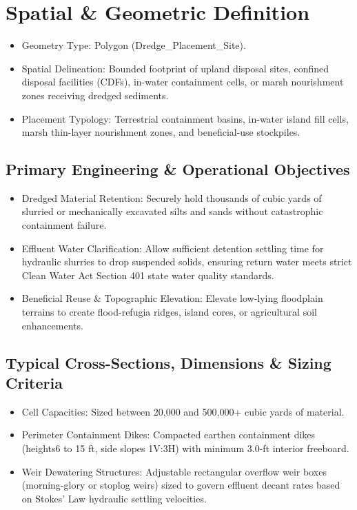 \documentclass[
  letterpaper,
  DIV=11,
  numbers=noendperiod]{scrreprt}
\begin{document}
\section{Spatial \& Geometric
Definition}\label{spatial-geometric-definition-17}

\begin{itemize}
\item
  Geometry Type: Polygon (Dredge\_Placement\_Site).
\item
  Spatial Delineation: Bounded footprint of upland disposal sites,
  confined disposal facilities (CDFs), in-water containment cells, or
  marsh nourishment zones receiving dredged sediments.
\item
  Placement Typology: Terrestrial containment basins, in-water island
  fill cells, marsh thin-layer nourishment zones, and beneficial-use
  stockpiles.
\end{itemize}

\subsection{Primary Engineering \& Operational
Objectives}\label{primary-engineering-operational-objectives}

\begin{itemize}
\item
  Dredged Material Retention: Securely hold thousands of cubic yards of
  slurried or mechanically excavated silts and sands without
  catastrophic containment failure.
\item
  Effluent Water Clarification: Allow sufficient detention settling time
  for hydraulic slurries to drop suspended solids, ensuring return water
  meets strict Clean Water Act Section 401 state water quality
  standards.
\item
  Beneficial Reuse \& Topographic Elevation: Elevate low-lying
  floodplain terrains to create flood-refugia ridges, island cores, or
  agricultural soil enhancements.
\end{itemize}

\subsection{Typical Cross-Sections, Dimensions \& Sizing
Criteria}\label{typical-cross-sections-dimensions-sizing-criteria-11}

\begin{itemize}
\item
  Cell Capacities: Sized between 20,000 and 500,000+ cubic yards of
  material.
\item
  Perimeter Containment Dikes: Compacted earthen containment dikes
  (heights6 to 15 ft, side slopes 1V:3H) with minimum 3.0-ft interior
  freeboard.
\item
  Weir Dewatering Structures: Adjustable rectangular overflow weir boxes
  (morning-glory or stoplog weirs) sized to govern effluent decant rates
  based on Stokes' Law hydraulic settling velocities.
\end{itemize}
\end{document}
